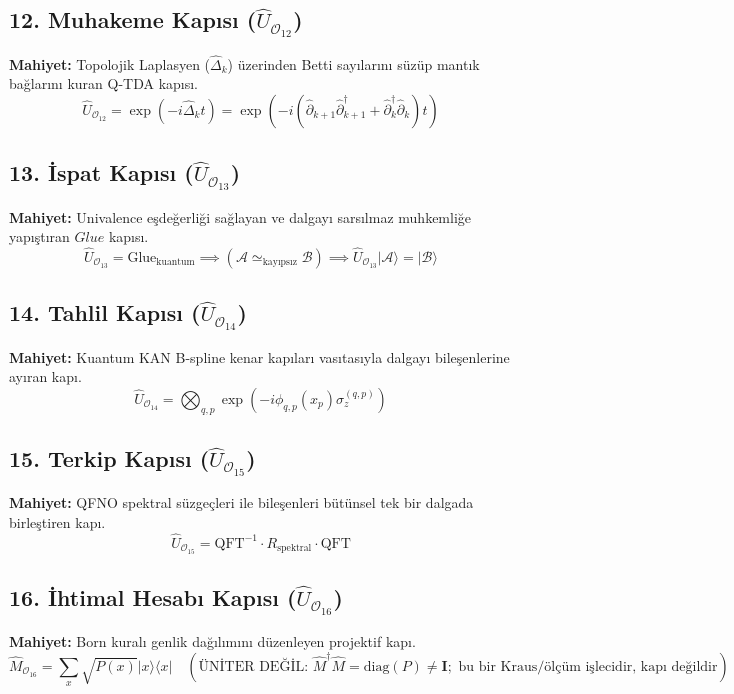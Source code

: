 \documentclass[11pt, a4paper]{article}
\begin{document}
\subsection{12. Muhakeme Kapısı ($\hat{U}_{\mathcal{O}_{12}}$)}
\textbf{Mahiyet:} Topolojik Laplasyen ($\hat{\Delta}_k$) üzerinden Betti sayılarını süzüp mantık bağlarını kuran Q-TDA kapısı.
\begin{equation}
\hat{U}_{\mathcal{O}_{12}} = \exp\left( -i \hat{\Delta}_k t \right) = \exp\left( -i (\hat{\partial}_{k+1} \hat{\partial}_{k+1}^\dagger + \hat{\partial}_k^\dagger \hat{\partial}_k) t \right)
\end{equation}

\subsection{13. İspat Kapısı ($\hat{U}_{\mathcal{O}_{13}}$)}
\textbf{Mahiyet:} Univalence eşdeğerliği sağlayan ve dalgayı sarsılmaz muhkemliğe yapıştıran $Glue$ kapısı.
\begin{equation}
\hat{U}_{\mathcal{O}_{13}} = \text{Glue}_{\text{kuantum}} \implies (\mathcal{A} \simeq_{\text{kayıpsız}} \mathcal{B}) \implies \hat{U}_{\mathcal{O}_{13}} |\mathcal{A}\rangle = |\mathcal{B}\rangle
\end{equation}

\subsection{14. Tahlil Kapısı ($\hat{U}_{\mathcal{O}_{14}}$)}
\textbf{Mahiyet:} Kuantum KAN B-spline kenar kapıları vasıtasıyla dalgayı bileşenlerine ayıran kapı.
\begin{equation}
\hat{U}_{\mathcal{O}_{14}} = \bigotimes_{q,p} \exp\left( -i \phi_{q,p}(x_p) \sigma_z^{(q,p)} \right)
\end{equation}

\subsection{15. Terkip Kapısı ($\hat{U}_{\mathcal{O}_{15}}$)}
\textbf{Mahiyet:} QFNO spektral süzgeçleri ile bileşenleri bütünsel tek bir dalgada birleştiren kapı.
\begin{equation}
\hat{U}_{\mathcal{O}_{15}} = \text{QFT}^{-1} \cdot R_{\text{spektral}} \cdot \text{QFT}
\end{equation}

\subsection{16. İhtimal Hesabı Kapısı ($\hat{U}_{\mathcal{O}_{16}}$)}
\textbf{Mahiyet:} Born kuralı genlik dağılımını düzenleyen projektif kapı.
\begin{equation}
\hat{M}_{\mathcal{O}_{16}} = \sum_x \sqrt{P(x)} |x\rangle \langle x| \quad (\text{ÜNİTER DEĞİL: } \hat{M}^\dagger \hat{M} = \mathrm{diag}(P) \neq \mathbf{I}; \text{ bu bir Kraus/ölçüm işlecidir, kapı değildir})
\end{equation}
\end{document}
